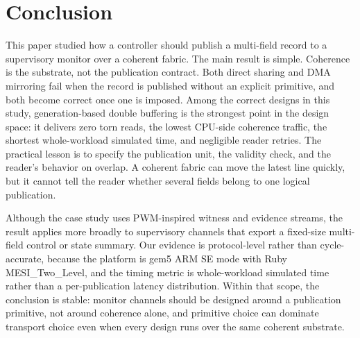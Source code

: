 \section{Conclusion}
\label{sec:conclusion}

This paper studied how a controller should publish a multi-field record
to a supervisory monitor over a coherent fabric. The main result is
simple. Coherence is the substrate, not the publication contract. Both
direct sharing and DMA mirroring fail when the record is published
without an explicit primitive, and both become correct once one is
imposed. Among the correct designs in this study, generation-based
double buffering is the strongest point in the design space: it delivers
zero torn reads, the lowest CPU-side coherence traffic, the shortest
whole-workload simulated time, and negligible reader retries. The
practical lesson is to specify the publication unit, the validity check,
and the reader's behavior on overlap. A coherent fabric can move the
latest line quickly, but it cannot tell the reader whether several
fields belong to one logical publication.

Although the case study uses PWM-inspired witness and evidence streams,
the result applies more broadly to supervisory channels that export a
fixed-size multi-field control or state summary. Our evidence is
protocol-level rather than cycle-accurate, because the platform is gem5
ARM SE mode with Ruby MESI\_Two\_Level, and the timing metric is
whole-workload simulated time rather than a per-publication latency
distribution. Within that scope, the conclusion is stable: monitor
channels should be designed around a publication primitive, not around
coherence alone, and primitive choice can dominate transport choice even
when every design runs over the same coherent substrate.
